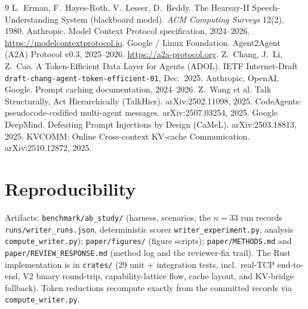 \documentclass[11pt]{article}
\begin{document}
\begin{thebibliography}{9}
 L.\ Erman, F.\ Hayes-Roth, V.\ Lesser, D.\ Reddy. The Hearsay-II Speech-Understanding
System (blackboard model). \emph{ACM Computing Surveys} 12(2), 1980.
 Anthropic. Model Context Protocol specification, 2024--2026. \url{https://modelcontextprotocol.io}.
 Google / Linux Foundation. Agent2Agent (A2A) Protocol v0.3, 2025--2026. \url{https://a2a-protocol.org}.
 Z.\ Chang, J.\ Li, Z.\ Cao. A Token-Efficient Data Layer for Agents (ADOL). IETF
Internet-Draft \texttt{draft-chang-agent-token-efficient-01}, Dec.\ 2025.
 Anthropic, OpenAI, Google. Prompt caching documentation, 2024--2026.
 Z.\ Wang et al. Talk Structurally, Act Hierarchically (TalkHier). arXiv:2502.11098, 2025.
 CodeAgents: pseudocode-codified multi-agent messages. arXiv:2507.03254, 2025.
 Google DeepMind. Defeating Prompt Injections by Design (CaMeL). arXiv:2503.18813, 2025.
 KVCOMM: Online Cross-context KV-cache Communication. arXiv:2510.12872, 2025.
\end{thebibliography}

\appendix
\section{Reproducibility}
Artifacts: \texttt{benchmark/ab\_study/} (harness, scenarios, the $n{=}33$ run records
\texttt{runs/writer\_runs.json}, deterministic scorer \texttt{writer\_experiment.py}, analysis
\texttt{compute\_writer.py}); \texttt{paper/figures/} (figure scripts); \texttt{paper/METHODS.md} and
\texttt{paper/REVIEW\_RESPONSE.md} (method log and the reviewer-fix trail). The Rust implementation is
in \texttt{crates/} (29 unit + integration tests, incl.\ real-TCP end-to-end, V2 binary round-trip,
capability-lattice flow, cache layout, and KV-bridge fallback). Token reductions recompute exactly
from the committed records via \texttt{compute\_writer.py}.
\end{document}
